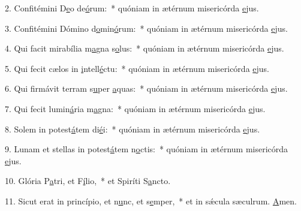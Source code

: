 2. Confitémini D\uline{e}o de\uline{ó}rum:~* quóniam in ætérnum misericórda \uline{e}jus.\par 
3. Confitémini Dómino d\uline{o}min\uline{ó}rum:~* quóniam in ætérnum misericórda \uline{e}jus.\par 
4. Qui facit mirabília m\uline{a}gna s\uline{o}lus:~* quóniam in ætérnum misericórda \uline{e}jus.\par 
5. Qui fecit cælos in \uline{i}ntell\uline{é}ctu:~* quóniam in ætérnum misericórda \uline{e}jus.\par 
6. Qui firmávit terram s\uline{u}per \uline{a}quas:~* quóniam in ætérnum misericórda \uline{e}jus.\par 
7. Qui fecit lumin\uline{á}ria m\uline{a}gna:~* quóniam in ætérnum misericórda \uline{e}jus.\par 
8. Solem in potest\uline{á}tem di\uline{é}i:~* quóniam in ætérnum misericórda \uline{e}jus.\par 
9. Lunam et stellas in potest\uline{á}tem n\uline{o}ctis:~* quóniam in ætérnum misericórda \uline{e}jus.\par 
10. Glória P\uline{a}tri, et F\uline{í}lio,~* et Spiríti S\uline{a}ncto.\par 
11. Sicut erat in princípio, et n\uline{u}nc, et s\uline{e}mper,~* et in sǽcula sæculrum. \uline{A}men.\par 
